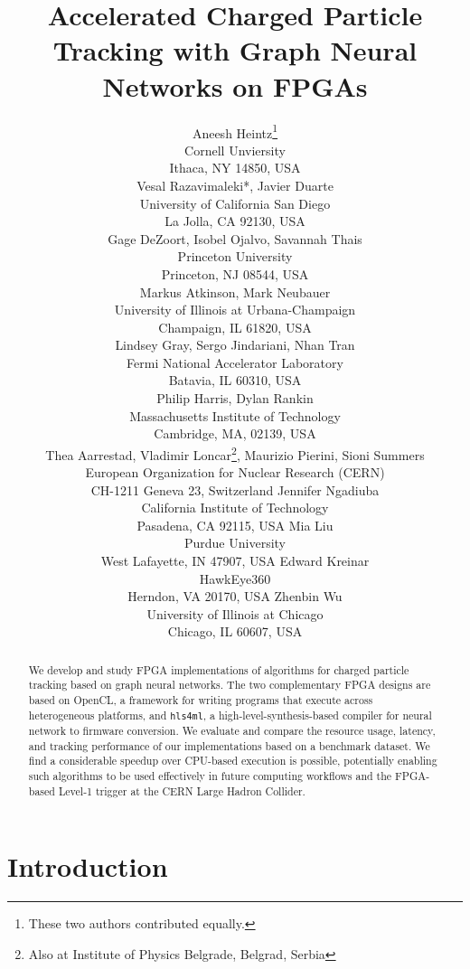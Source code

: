 \documentclass{article}
\title{Accelerated Charged Particle Tracking with Graph Neural Networks on FPGAs}
\author{
  Aneesh Heintz\thanks{These two authors contributed equally.} \\
  Cornell Unviersity \\
  Ithaca, NY 14850, USA\\
  \And
  Vesal Razavimaleki*, Javier Duarte\\
  University of California San Diego\\
  La Jolla, CA 92130, USA \\
  \And
  Gage DeZoort, Isobel Ojalvo, Savannah Thais \\
  Princeton University \\
  Princeton, NJ 08544, USA \\
  \And
  Markus Atkinson, Mark Neubauer\\
  University of Illinois at Urbana-Champaign \\
  Champaign, IL 61820, USA\\
  \And
  Lindsey Gray, Sergo Jindariani, Nhan Tran \\
  Fermi National Accelerator Laboratory \\
  Batavia, IL 60310, USA\\
  \And
  Philip Harris, Dylan Rankin \\
  Massachusetts Institute of Technology \\
  Cambridge, MA, 02139, USA\\
  \And
  Thea Aarrestad, Vladimir Loncar\thanks{Also at Institute of Physics Belgrade, Belgrad, Serbia}, Maurizio Pierini, Sioni Summers \\
  European Organization for Nuclear Research (CERN) \\
  CH-1211 Geneva 23, Switzerland
  \And
  Jennifer Ngadiuba \\
  California Institute of Technology \\
  Pasadena, CA 92115, USA
  \And
  Mia Liu \\
  Purdue University \\
  West Lafayette, IN 47907, USA
  \And
  Edward Kreinar\\
  HawkEye360\\
  Herndon, VA 20170, USA
  \And
  Zhenbin Wu\\
  University of Illinois at Chicago\\
  Chicago, IL 60607, USA
}
\newcommand{\TODO}[1]{\textcolor{red}{TODO: #1}}
\newcommand{\hlsfml}{\texttt{hls4ml}\xspace}
\begin{document}

\maketitle

\begin{abstract}
We develop and study FPGA implementations of algorithms for charged particle tracking based on graph neural networks. 
The two complementary FPGA designs are based on OpenCL, a framework for writing programs that execute across heterogeneous platforms, and \hlsfml, a high-level-synthesis-based compiler for neural network to firmware conversion.
We evaluate and compare the resource usage, latency, and tracking performance of our implementations based on a benchmark dataset.
We find a considerable speedup over CPU-based execution is possible, potentially enabling such algorithms to be used effectively in future computing workflows and the FPGA-based Level-1 trigger at the CERN Large Hadron Collider.
\end{abstract}

\section{Introduction}
\end{document}
